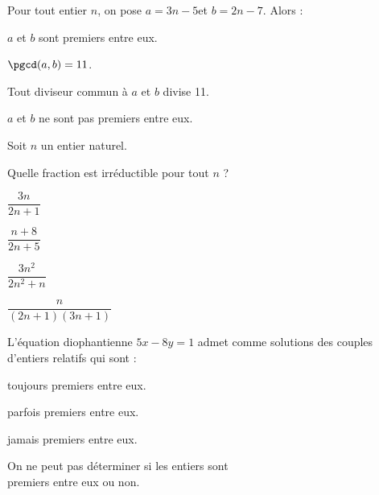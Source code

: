 \begin{QCM}
\begin{GroupeQCM}
\begin{exercice}
  Pour tout entier $n$, on pose \enskip $a=3n-5$\enskip et\enskip
  $b=2n-7$. Alors :
\begin{ChoixQCM}{2}
\item $a$ et $b$ sont premiers entre eux.
\item $\pgcd(a,b)=11$.
\item Tout diviseur commun à $a$ et $b$ divise 11.
\item $a$ et $b$ ne sont pas premiers entre eux.
\end{ChoixQCM}
\end{exercice}
\begin{corrige}
\end{corrige}

\begin{exercice}
Soit $n$ un entier naturel. 

Quelle fraction est irréductible pour tout $n$ ?
\begin{ChoixQCM}{4}
\item $\dfrac{3n}{2n+1}$
\item $\dfrac{n+8}{2n+5}$
\item $\dfrac{3n^2}{2n^2+n}$
\item $\dfrac{n}{(2n+1)(3n+1)}$
\end{ChoixQCM}
\end{exercice}
\begin{corrige}
\end{corrige}

\begin{exercice}
L'équation diophantienne \enskip $5x-8y=1$ admet comme solutions des couples d'entiers relatifs qui sont :
\end{exercice}
\begin{ChoixQCM}{2}
\item toujours premiers entre eux.
\item parfois premiers entre eux.
\item jamais premiers entre eux.
\item On ne peut pas déterminer si les entiers sont\\ premiers entre eux ou non.
\end{ChoixQCM}
\begin{corrige}
\end{corrige}
\end{GroupeQCM}
\end{QCM}

